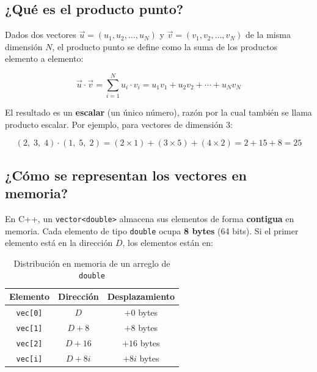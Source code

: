 \documentclass[12pt, letterpaper]{article}
\begin{document}
\subsection*{¿Qué es el producto punto?}

Dados dos vectores $\vec{u} = (u_1, u_2, \ldots, u_N)$ y $\vec{v} = (v_1, v_2, \ldots, v_N)$ de la misma dimensión $N$, el producto punto se define como la suma de los productos elemento a elemento:

\begin{equation}
    \vec{u} \cdot \vec{v} = \sum_{i=1}^{N} u_i \cdot v_i = u_1 v_1 + u_2 v_2 + \cdots + u_N v_N
\end{equation}

El resultado es un \textbf{escalar} (un único número), razón por la cual también se llama producto escalar. Por ejemplo, para vectores de dimensión 3:

\begin{equation}
    (2,\; 3,\; 4) \cdot (1,\; 5,\; 2) = (2 \times 1) + (3 \times 5) + (4 \times 2) = 2 + 15 + 8 = 25
\end{equation}

\subsection*{¿Cómo se representan los vectores en memoria?}

En C++, un \texttt{vector<double>} almacena sus elementos de forma \textbf{contigua} en memoria. Cada elemento de tipo \texttt{double} ocupa \textbf{8 bytes} (64 bits). Si el primer elemento está en la dirección $D$, los elementos están en:

\begin{table}[H]
    \centering
    \begin{tabular}{@{}ccc@{}}
        \toprule
        \textbf{Elemento} & \textbf{Dirección} & \textbf{Desplazamiento} \\
        \midrule
        \texttt{vec[0]} & $D$       & $+0$ bytes \\
        \texttt{vec[1]} & $D + 8$   & $+8$ bytes \\
        \texttt{vec[2]} & $D + 16$  & $+16$ bytes \\
        \texttt{vec[i]} & $D + 8i$  & $+8i$ bytes \\
        \bottomrule
    \end{tabular}
    \caption{Distribución en memoria de un arreglo de \texttt{double}}
\end{table}
\end{document}
